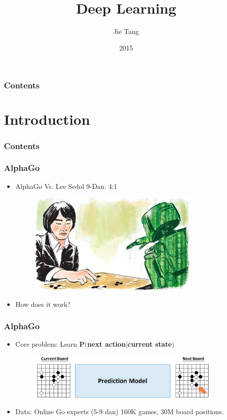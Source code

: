 \documentclass{beamer}
\begin{document}
\title{Deep Learning}
\author{Jie Tang}
\date{2015}

\begin{frame}
\titlepage
\end{frame}


\begin{frame}
  \frametitle{Contents}
  \tableofcontents
\end{frame}

\section{Introduction}

\begin{frame}
  \frametitle{Contents}
  \tableofcontents[currentsection]
\end{frame}

\begin{frame}
\frametitle{AlphaGo}
\begin{itemize}
\item AlphaGo Vs. Lee Sedol 9-Dan: 4:1
\begin{figure}
      \includegraphics[width=0.8\textwidth]{figs/alphago0.png}
\end{figure}
\item How does it work? 
\end{itemize}
\end{frame}

\begin{frame}
\frametitle{AlphaGo}
\begin{itemize}
\item Core problem: Learn $\mathbf{P(}$\textbf{next action}$ | $\textbf{current state}$\mathbf{)}$
\begin{figure}
      \includegraphics[width=0.9\textwidth]{figs/alphago1.png}
\end{figure}
\item Data: Online Go experts (5-9 dan) 160K games, 30M board positions.
\end{itemize}
\end{frame}
\end{document}
